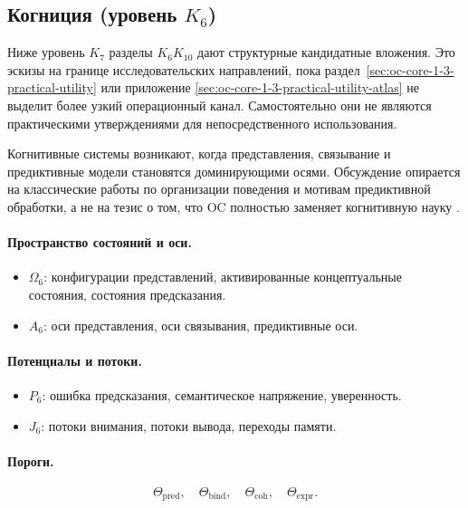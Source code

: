 \subsection{Когниция (уровень \texorpdfstring{$K_6$}{K6})}

Ниже уровень \(K_7\) разделы \(K_6\)\textendash\(K_{10}\) дают
структурные кандидатные вложения.
Это эскизы на границе исследовательских направлений, пока
раздел~\ref{sec:oc-core-1-3-practical-utility} или приложение
\ref{sec:oc-core-1-3-practical-utility-atlas} не выделит более узкий
операционный канал.
Самостоятельно они не являются практическими утверждениями для непосредственного
использования.

Когнитивные системы возникают, когда представления, связывание и
предиктивные модели становятся доминирующими осями.
Обсуждение опирается на классические работы по организации поведения и
мотивам предиктивной обработки, а не на тезис о том, что OC полностью
заменяет когнитивную науку \parencite{hebb_organization,friston_free_energy}.

\paragraph{Пространство состояний и оси.}
\begin{itemize}
  \item \(\Omega_6\): конфигурации представлений, активированные
        концептуальные состояния, состояния предсказания.
  \item \(A_6\): оси представления, оси связывания, предиктивные оси.
\end{itemize}

\paragraph{Потенциалы и потоки.}
\begin{itemize}
  \item \(P_6\): ошибка предсказания, семантическое напряжение,
        уверенность.
  \item \(J_6\): потоки внимания, потоки вывода, переходы памяти.
\end{itemize}

\paragraph{Пороги.}
\[
  \Theta_{\mathrm{pred}},\quad
  \Theta_{\mathrm{bind}},\quad
  \Theta_{\mathrm{coh}},\quad
  \Theta_{\mathrm{expr}}.
\]

